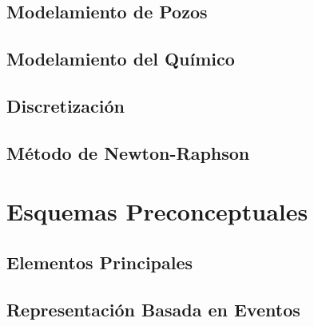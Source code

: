 \subsection{Modelamiento de Pozos}
%
\subsection{Modelamiento del Químico}
%
\subsection{Discretización}

\subsection{Método de Newton-Raphson}
%

\section{Esquemas Preconceptuales}

\subsection{Elementos Principales}

\subsection{Representación Basada en Eventos}